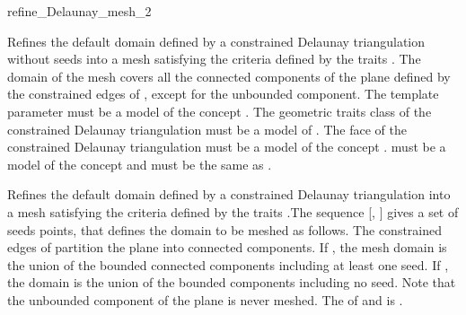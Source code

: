 \begin{ccRefFunction}{refine_Delaunay_mesh_2}


{ Refines the default domain defined by a constrained Delaunay
  triangulation without seeds into a mesh satisfying the criteria
  defined by the traits . The domain of the mesh
  covers all the connected components of the plane defined by the
  constrained edges of , except for the unbounded component.
  \ccPrecond The template parameter  must be a model of the
  concept . The geometric traits
  class of the constrained Delaunay triangulation must be a model
  of .
  \ccRequire The face of the constrained
  Delaunay triangulation must be a model of the concept
  .  must be a model of the
  concept  and  must be the same
  as . }

                     { Refines the default domain defined by a constrained
                       Delaunay triangulation into a mesh
                       satisfying the criteria defined by the traits
                       .The sequence [, ]
                       gives a set of seeds points, that defines the domain
                       to be meshed as follows. The constrained edges of
                        partition the plane into connected components.
                       If , the mesh domain is the union of
                       the bounded connected components including at least
                       one seed. If , the domain is the
                       union of the bounded components including no seed.
                       Note that the unbounded component of the plane is
                       never meshed.
                       \ccRequire The  of  and
                        is .}

\end{ccRefFunction}

